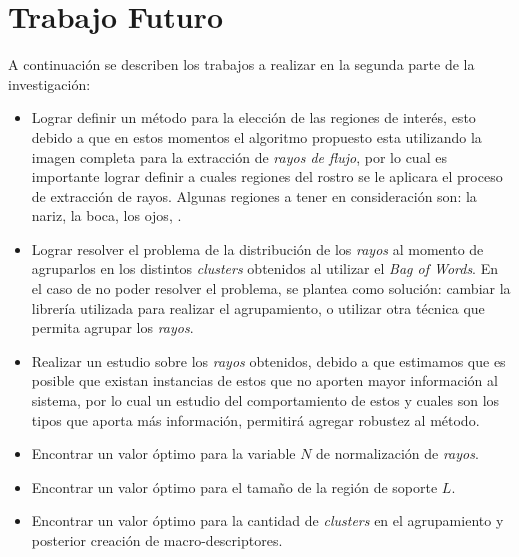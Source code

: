 \section{Trabajo Futuro}

A continuación se describen los trabajos a realizar en la segunda parte de la investigación:

\begin{itemize}
	\item Lograr definir un método para la elección de las regiones de interés, esto debido a que en estos momentos el algoritmo propuesto esta utilizando la imagen completa para la extracción de \textit{rayos de flujo}, por lo cual es importante lograr definir a cuales regiones del rostro se le aplicara el proceso de extracción de rayos. Algunas regiones a tener en consideración son: la nariz, la boca, los ojos, \etc.
	
	\item Lograr resolver el problema de la distribución de los \textit{rayos} al momento de agruparlos en los distintos \textit{clusters} obtenidos al utilizar el \textit{Bag of Words}. En el caso de no poder resolver el problema, se plantea como solución: cambiar la librería utilizada para realizar el agrupamiento, o utilizar otra técnica que permita agrupar los \textit{rayos}. 
	
	\item Realizar un estudio sobre los \textit{rayos} obtenidos, debido a que estimamos que es posible que existan instancias de estos que no aporten mayor información al sistema, por lo cual un estudio del comportamiento de estos y cuales son los tipos que aporta más información, permitirá agregar robustez al método.
	
	\item Encontrar un valor óptimo para la variable $N$ de normalización de \textit{rayos}.
		
	\item Encontrar un valor óptimo para el tamaño de la región de soporte $L$.
	
	\item Encontrar un valor óptimo para la cantidad de \textit{clusters} en el agrupamiento y posterior creación de macro-descriptores.
\end{itemize}